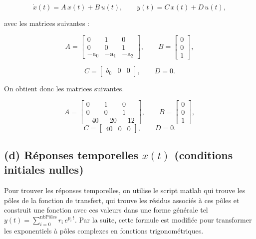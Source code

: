 \documentclass[12pt]{article}
\begin{document}
    \[
        \dot{x}(t) = A\,x(t) + B\,u(t), \qquad y(t) = C\,x(t) + D\,u(t),
    \]

    avec les matrices suivantes :

    \[
        A =
        \begin{bmatrix}
            0 & 1 & 0 \\
            0 & 0 & 1 \\
            -\mathrm{a}_{0} & -\mathrm{a}_{1} & -\mathrm{a}_{2}
        \end{bmatrix},
        \qquad
        B =
        \begin{bmatrix}
            0 \\
            0 \\
            1
        \end{bmatrix},
    \]

    \[
        C =
        \begin{bmatrix}
            b_0 & 0 & 0
        \end{bmatrix},
        \qquad
        D = 0.
    \]

    On obtient donc les matrices suivantes.

    \[
        A=
        \begin{bmatrix}
            0 & 1 & 0 \\
            0 & 0 & 1 \\
            -40 & -20 & -12
        \end{bmatrix},
        \qquad
        B=
        \begin{bmatrix}
            0 \\
            0 \\
            1
        \end{bmatrix},
    \]
    \[
        C=
        \begin{bmatrix}
            40 & 0 & 0
        \end{bmatrix},
        \qquad
        D=0.
    \]

    \subsection{(d) Réponses temporelles $x(t)$ (conditions initiales nulles)}
    Pour trouver les réponses temporelles, on utilise le script matlab qui trouve les pôles de la fonction de transfert, qui trouve les résidus associés à ces pôles et construit une fonction avec ces valeurs dans une forme générale tel $y(t)= \sum_{i=0}^{\text{nbPôles}} r_i\,e^{p_i \,t}$. Par la suite, cette formule est modifiée pour transformer les exponentiels à pôles complexes en fonctions trigonométriques.
\end{document}
